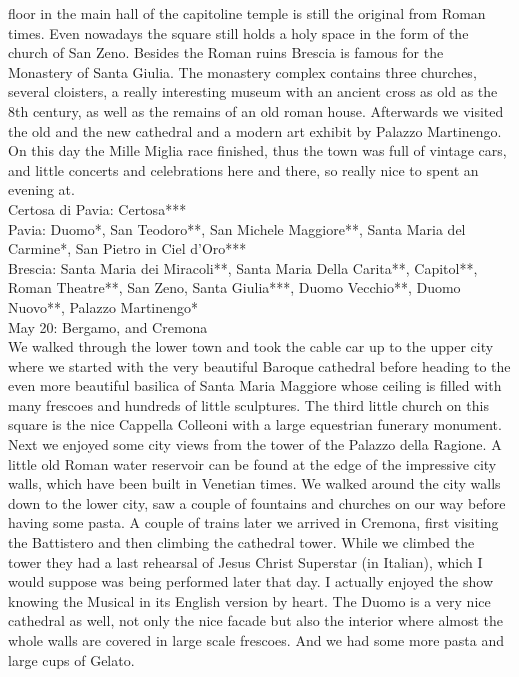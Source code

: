 floor in the main hall of the capitoline temple is still the original from Roman times. Even nowadays the square still holds a holy space in the form of the church of San Zeno. Besides the Roman ruins Brescia is famous for the Monastery of Santa Giulia. The monastery complex contains three churches, several cloisters, a really interesting museum with an ancient cross as old as the 8th century, as well as the remains of an old roman house. Afterwards we visited the old and the new cathedral and a modern art exhibit by Palazzo Martinengo. On this day the Mille Miglia race finished, thus the town was full of vintage cars, and little concerts and celebrations here and there, so really nice to spent an evening at.\\

Certosa di Pavia: Certosa***\\
Pavia: Duomo*, San Teodoro**, San Michele Maggiore**, Santa Maria del Carmine*, San Pietro in Ciel d'Oro***\\
Brescia: Santa Maria dei Miracoli**, Santa Maria Della Carita**, Capitol**, Roman Theatre**, San Zeno, Santa Giulia***, Duomo Vecchio**, Duomo Nuovo**, Palazzo Martinengo*\\

May 20: Bergamo, and Cremona\\
We walked through the lower town and took the cable car up to the upper city where we started with the very beautiful Baroque cathedral before heading to the even more beautiful basilica of Santa Maria Maggiore whose ceiling is filled with many frescoes and hundreds of little sculptures. The third little church on this square is the nice Cappella Colleoni with a large equestrian funerary monument. Next we enjoyed some city views from the tower of the Palazzo della Ragione. A little old Roman water reservoir can be found at the edge of the impressive city walls, which have been built in Venetian times. We walked around the city walls down to the lower city, saw a couple of fountains and churches on our way before having some pasta. A couple of trains later we arrived in Cremona, first visiting the Battistero and then climbing the cathedral tower. While we climbed the tower they had a last rehearsal of Jesus Christ Superstar (in Italian), which I would suppose was being performed later that day. I actually enjoyed the show knowing the Musical in its English version by heart. The Duomo is a very nice cathedral as well, not only the nice facade but also the interior where almost the whole walls are covered in large scale frescoes. And we had some more pasta and large cups of Gelato.\\ 

